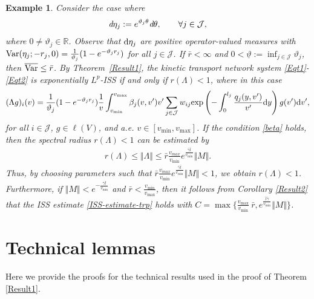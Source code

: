 \documentclass[onecolumn]{autart}
\def\R{{\mathbb{R}}}
\def\R{\mathbb R}
\newtheorem{example}{Example}[section]
\numberwithin{equation}{section}
\begin{document}
	\begin{example}
		Consider the case where
		\begin{align*}
			 \emph{d}\eta_j:=e^{\vartheta_j\theta}\emph{d}\theta,\qquad \forall j\in \mathcal{J},
		\end{align*}
        		where $0\neq\vartheta_j\in \R$. Observe that ${\rm d}\eta_j$ are positive operator-valued measures with ${{\rm Var}}(\eta_j;-r_{j},0)=\frac{1}{\vartheta_j}(1-e^{-\vartheta_jr_j})$ for all $j\in \mathcal{J}$. If $\bar{r}<\infty$ and $0< \underline{\vartheta}:=\inf_{j\in \mathcal{J}}\vartheta_j $, then $\overline{{\rm Var}}\le \bar{r}$. By Theorem~\ref{Result1}, the kinetic transport network system \eqref{Eqt1}-\eqref{Eqt2} is exponentially $L^p$-ISS if and only if $r(\Lambda)<1$, where in this case
		\begin{align*}
			(\Lambda g)_i(v)=\frac{1}{\vartheta_j}(1-e^{-\vartheta_jr_j})\frac{1}{v}\int_{v_{\min}}^{v_{\max}}\beta_j(v,v')v'\sum_{j\in \mathcal{J}}w_{ij} {{\exp}}\left(-\int_0^{l_j} \frac{ q_j(y,v')}{v'} {\rm d}y  \right)g(v'){\rm d}v',
		\end{align*}
		for all $i\in \mathcal{J}$, $g\in {\bm \ell}(V)$, and a.e. $v\in [v_{\min},v_{\max}]$. If the condition \eqref{beta} holds, then the spectral radius $r(\Lambda)<1$ can be estimated by
		 \begin{align*}
			 r(\Lambda)\le \Vert \Lambda\Vert\le \bar{r}\frac{v_{max}}{v_{\min}}e^{\frac{\bar{\gamma}\bar{l}}{v_{\min}}}\Vert M \Vert.
		 \end{align*}
		Thus, by choosing parameters such that $\bar{r}\frac{v_{max}}{v_{\min}}e^{\frac{\bar{\gamma}\bar{l}}{v_{\min}}}\Vert M \Vert<1$, we obtain $r(\Lambda)<1$. Furthermore, if $\Vert M \Vert<e^{-\frac{\bar{\gamma}\bar{l}}{v_{\min}}}$ and $ \bar{r}<\frac{v_{\min}}{v_{\max}}$, then it follows from Corollary \ref{Result2} that the ISS estimate \eqref{ISS-estimate-trp} holds with $C=\max\{\frac{v_{\max}}{v_{\min}}\ \bar{r},e^{\frac{ \bar{l}\bar{\gamma}}{v_{\min}}}\Vert M \Vert\}$.
	\end{example}
	
	
	\appendix
	
	\section{Technical lemmas}\label{App1}
	Here we provide the proofs for the technical results used in the proof of Theorem \ref{Result1}.
	
\end{document}
